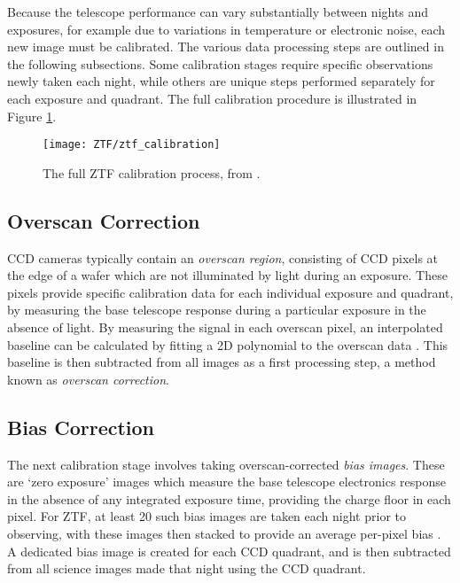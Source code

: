 Because the telescope performance can vary substantially between nights and exposures, for example due to variations in temperature or electronic noise, each new image must be calibrated. The various data processing steps are outlined in the following subsections. Some calibration stages require specific observations newly taken each night, while others are unique steps performed separately for each exposure and quadrant. The full calibration procedure is illustrated in Figure \ref{fig:ztf_calibration}.

\begin{figure}[!ht]
	\centering \texttt{[image: ZTF/ztf\_calibration]}
	\caption{The full ZTF calibration process, from \cite{ztf_data_processing}.}
	\label{fig:ztf_calibration}
\end{figure}

\subsection*{Overscan Correction}

CCD cameras typically contain an \emph{overscan region}, consisting of CCD pixels at the edge of a wafer which are not illuminated by light during an exposure. These pixels provide specific calibration data for each individual exposure and quadrant, by measuring the base telescope response during a particular exposure in the absence of light. By measuring the signal in each overscan pixel, an interpolated baseline can be calculated by fitting a 2D polynomial to the overscan data \cite{ztf_data_processing}. This baseline is then subtracted from all images as a first processing step, a method known as \emph{overscan correction}. 

\subsection*{Bias Correction}

The next calibration stage involves taking overscan-corrected \emph{bias images}. These are `zero exposure' images which measure the base telescope electronics response in the absence of any integrated exposure time, providing the charge floor in each pixel. For ZTF, at least 20 such bias images are taken each night prior to observing, with these images then stacked to provide an average per-pixel bias \cite{ztf_data_processing}. A dedicated bias image is created for each CCD quadrant, and is then subtracted from all science images made that night using the CCD quadrant.

